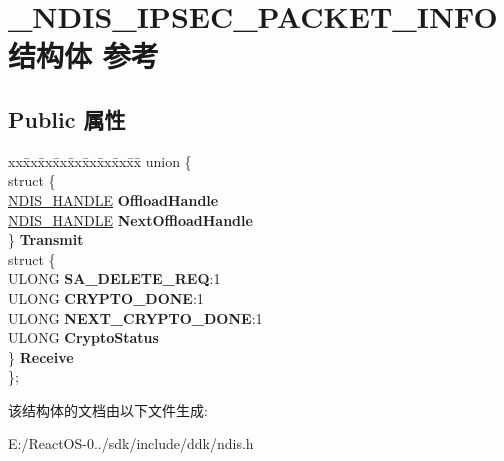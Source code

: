 \hypertarget{struct___n_d_i_s___i_p_s_e_c___p_a_c_k_e_t___i_n_f_o}{}\section{\+\_\+\+N\+D\+I\+S\+\_\+\+I\+P\+S\+E\+C\+\_\+\+P\+A\+C\+K\+E\+T\+\_\+\+I\+N\+F\+O结构体 参考}
\label{struct___n_d_i_s___i_p_s_e_c___p_a_c_k_e_t___i_n_f_o}
\subsection*{Public 属性}
\begin{DoxyCompactItemize}
\item 
\mbox{\label{struct___n_d_i_s___i_p_s_e_c___p_a_c_k_e_t___i_n_f_o_ade7b21b04285539c4c760a650c7c576c}} 
\begin{tabbing}
xx\=xx\=xx\=xx\=xx\=xx\=xx\=xx\=xx\=\kill
union \{\\
\>struct \{\\
\>\>\hyperlink{interfacevoid}{NDIS\_HANDLE} {\bfseries OffloadHandle}\\
\>\>\hyperlink{interfacevoid}{NDIS\_HANDLE} {\bfseries NextOffloadHandle}\\
\>\} {\bfseries Transmit}\\
\>struct \{\\
\>\>ULONG {\bfseries SA\_DELETE\_REQ}:1\\
\>\>ULONG {\bfseries CRYPTO\_DONE}:1\\
\>\>ULONG {\bfseries NEXT\_CRYPTO\_DONE}:1\\
\>\>ULONG {\bfseries CryptoStatus}\\
\>\} {\bfseries Receive}\\
\}; \\

\end{tabbing}\end{DoxyCompactItemize}


该结构体的文档由以下文件生成\+:\begin{DoxyCompactItemize}
\item 
E\+:/\+React\+O\+S-\/0../sdk/include/ddk/ndis.\+h\end{DoxyCompactItemize}
